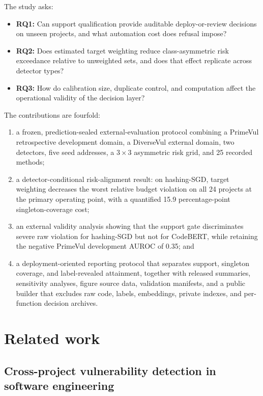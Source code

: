 \documentclass[preprint,12pt]{elsarticle}
\begin{document}
The study asks:

\begin{itemize}
  \item \textbf{RQ1:} Can support qualification provide auditable deploy-or-review decisions on unseen projects, and what automation cost does refusal impose?
  \item \textbf{RQ2:} Does estimated target weighting reduce class-asymmetric risk exceedance relative to unweighted sets, and does that effect replicate across detector types?
  \item \textbf{RQ3:} How do calibration size, duplicate control, and computation affect the operational validity of the decision layer?
\end{itemize}

The contributions are fourfold:

\begin{enumerate}
  \item a frozen, prediction-sealed external-evaluation protocol combining a PrimeVul retrospective development domain, a DiverseVul external domain, two detectors, five seed addresses, a $3 \times 3$ asymmetric risk grid, and 25 recorded methods;
  \item a detector-conditional risk-alignment result: on hashing-SGD, target weighting decreases the worst relative budget violation on all 24 projects at the primary operating point, with a quantified 15.9 percentage-point singleton-coverage cost;
  \item an external validity analysis showing that the support gate discriminates severe raw violation for hashing-SGD but not for CodeBERT, while retaining the negative PrimeVul development AUROC of 0.35; and
  \item a deployment-oriented reporting protocol that separates support, singleton coverage, and label-revealed attainment, together with released summaries, sensitivity analyses, figure source data, validation manifests, and a public builder that excludes raw code, labels, embeddings, private indexes, and per-function decision archives.
\end{enumerate}

\section{Related work}

\subsection{Cross-project vulnerability detection in software engineering}
\end{document}
